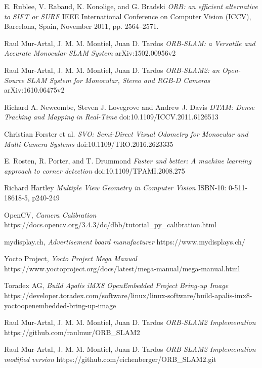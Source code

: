 \documentclass[11pt,a4paper,titlepage,oneside]{report}
\begin{document}
\begin{thebibliography}{1}

	E. Rublee, V. Rabaud, K. Konolige, and G. Bradski
	\textit{ORB: an efficient alternative to SIFT or SURF} 
	IEEE International Conference on Computer Vision (ICCV), Barcelona, Spain, November 2011, pp. 2564–2571.

  Raul Mur-Artal, J. M. M. Montiel, Juan D. Tardos
  \textit{ORB-SLAM: a Versatile and Accurate Monocular SLAM System}
  arXiv:1502.00956v2

  Raul Mur-Artal, J. M. M. Montiel, Juan D. Tardos
  \textit{ORB-SLAM2: an Open-Source SLAM System for Monocular, Stereo and RGB-D Cameras}
	arXiv:1610.06475v2 

	Richard A. Newcombe, Steven J. Lovegrove and Andrew J. Davis
	\textit{DTAM: Dense Tracking and Mapping in Real-Time}
	doi:10.1109/ICCV.2011.6126513

	Christian Forster et al.
	\textit{SVO: Semi-Direct Visual Odometry for Monocular and Multi-Camera Systems}
	doi:10.1109/TRO.2016.2623335

	E. Rosten, R. Porter, and T. Drummond 
	\textit{Faster and better: A machine learning approach to corner detection}
	doi:10.1109/TPAMI.2008.275

	Richard Hartley
	\textit{Multiple View Geometry in Computer Vision}
	ISBN-10: 0-511-18618-5, p240-249

	OpenCV,
	\textit{Camera Calibration}
	https://docs.opencv.org/3.4.3/dc/dbb/tutorial\_py\_calibration.html

	mydisplay.ch,
	\textit{Advertisement board manufacturer}
	https://www.mydisplays.ch/

	Yocto Project,
	\textit{Yocto Project Mega Manual}
	https://www.yoctoproject.org/docs/latest/mega-manual/mega-manual.html

	Toradex AG,
	\textit{Build Apalis iMX8 OpenEmbedded Project Bring-up Image}
	https://developer.toradex.com/software/linux/linux-software/build-apalis-imx8-yoctoopenembedded-bring-up-image

  Raul Mur-Artal, J. M. M. Montiel, Juan D. Tardos
  \textit{ORB-SLAM2 Implemenation}
	https://github.com/raulmur/ORB\_SLAM2

  Raul Mur-Artal, J. M. M. Montiel, Juan D. Tardos
  \textit{ORB-SLAM2 Implemenation modified version}
	https://github.com/eichenberger/ORB\_SLAM2.git


\end{thebibliography}
\end{document}
